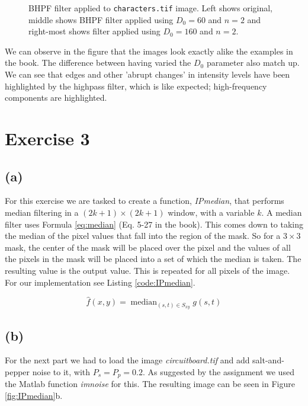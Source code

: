 \documentclass{article}
\begin{document}
\begin{figure}[ht]
    \centering
    
    \caption{BHPF filter applied to \texttt{characters.tif} image. Left shows original, middle shows BHPF filter applied using $D_0 = 60$ and $n = 2$ and right-most shows filter applied using $D_0 = 160$ and $n = 2$.}
    \label{fig:characters_all_bhpf}
\end{figure}

We can observe in the figure that the images look exactly alike the examples in the book. The difference between having varied the $D_0$ parameter also match up. We can see that edges and other 'abrupt changes' in intensity levels have been highlighted by the highpass filter, which is like expected; high-frequency components are highlighted.

\section*{Exercise 3}
\subsection*{(a)}
For this exercise we are tasked to create a function, \textit{IPmedian}, that performs median filtering in a $(2k + 1) \times (2k + 1)$ window, with a variable $k$. A median filter uses Formula \ref{eq:median} (Eq. 5-27 in the book). This comes down to taking the median of the pixel values that fall into the region of the mask. So for a $3 \times 3$ mask, the center of the mask will be placed over the pixel and the values of all the pixels in the mask will be placed into a set of which the median is taken. The resulting value is the output value. This is repeated for all pixels of the image. For our implementation see  Listing \ref{code:IPmedian}.

\begin{equation}\label{eq:median}
    \widehat{f}(x, y)=\operatorname{median}_{(s, t) \in S_{x y}} g(s, t)
\end{equation}

\subsection*{(b)}
For the next part we had to load the image \textit{circuitboard.tif} and add salt-and-pepper noise to it, with $P_s = P_p = 0.2$. As suggested by the assignment we used the Matlab function \textit{imnoise} for this. The resulting image can be seen in Figure \ref{fig:IPmedian}b.
\end{document}
